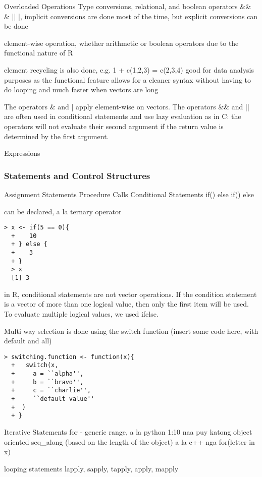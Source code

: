 \documentclass[12pt]{article}
\begin{document}
Overloaded Operations
Type conversions, relational, and boolean operators
 \&\& \& || |, implicit conversions are done most of the time, but explicit conversions can be done

 element-wise operation, whether arithmetic or boolean operators due to the functional nature of R

 element recycling is also done, e.g. 1 + c(1,2,3) = c(2,3,4)
 good for data analysis purposes as the functional feature allows for a cleaner syntax without having to do looping and much faster when vectors are long

 The operators \& and | apply element-wise on vectors. The operators \&\& and || are often used in conditional statements and use lazy evaluation as in C: the operators will not evaluate their second argument if the return value is determined by the first argument.

Expressions

\subsubsection{Statements and Control Structures}
Assignment Statements
Procedure Calls
Conditional Statements
if(){}
else if(){}
else{}

can be declared, a la ternary operator

\begin{lstlisting}[frame=single]
  > x <- if(5 == 0){
  +    10
  + } else {
  +    3
  + }
  > x
  [1] 3
\end{lstlisting}

in R, conditional statements are not vector operations. If the condition statement is a vector of more than one logical value, then only the first item will be used. To evaluate multiple logical values, we used ifelse.

Multi way selection is done using the switch function (insert some code here, with default and all)

\begin{lstlisting}[frame=single]
  > switching.function <- function(x){
  +   switch(x,
  +     a = ``alpha'',
  +     b = ``bravo'',
  +     c = ``charlie'',
  +     ``default value''
  +  )
  + }
\end{lstlisting}

Iterative Statements
for - generic
range, a la python 1:10
naa puy katong object oriented seq\_along (based on the length of the object)
a la c++ nga for(letter in x)

looping statements
lapply, sapply, tapply, apply, mapply
\end{document}
